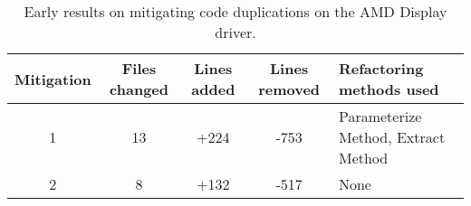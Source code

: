 \begin{table}
\begin{tabular}{ | c | c | c | c | m{6em} | }

\hline

\textbf{Mitigation} & \textbf{Files changed} & \textbf{Lines added} & \textbf{Lines removed} & \textbf{Refactoring methods used}
\\ \hline 

1 & 13 & +224 & -753 & Parameterize Method, Extract Method  \\ \hline
2 & 8 & +132 & -517 & None \\ \hline

\hline
\end{tabular}
\caption{Early results on mitigating code duplications on the AMD Display driver.}
\label{tab:patch}
\end{table}
